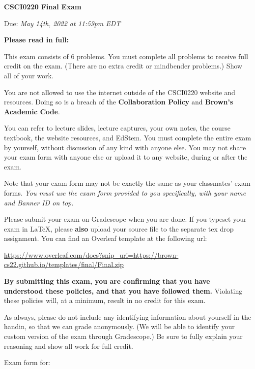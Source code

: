   \thispagestyle{firstpagestyle}
  \begin{center}
    {\huge \textbf{CSCI0220 Final Exam}}

    {\large Due: \textit{May 14th, 2022 at 11:59pm EDT}}
  \end{center}
  
 {\large \textbf{Please read in full:}}
 
This exam consists of 6 problems. You must complete all problems to receive full credit on the exam. 
(There are no extra credit or mindbender problems.) Show all of your work.
 
You are not allowed to use the internet outside of the CSCI0220 website and resources. Doing so is a breach of the \textbf{Collaboration Policy} and \textbf{Brown's Academic Code}.

You can refer to lecture slides, lecture captures, your own notes, the course textbook, the website resources, and EdStem. You must complete the entire exam by yourself, without discussion of any kind with anyone else.
You may not share your exam form with anyone else or upload it to any website, during or after the exam.

Note that your exam form may not be exactly the same as your classmates' exam forms. \emph{You must use the exam form provided to you specifically, with your name and Banner ID on top.}

Please submit your exam on Gradescope when you are done. If you typeset your exam in \LaTeX, please \textbf{also} upload your source file to the separate tex drop assignment.
You can find an Overleaf template at the following url:

{\scriptsize
\url{https://www.overleaf.com/docs?snip_uri=https://brown-cs22.github.io/templates/final/Final.zip}
}

\textbf{By submitting this exam, you are confirming that you have understood these policies, and that you have followed them.} Violating these policies will, at a minimum, result in no credit for this exam.

As always, please do not include any identifying information about yourself in the handin, so that we can grade anonymously. (We will be able to identify your custom version of the exam through Gradescope.) Be sure to fully explain your reasoning and show all work for full credit.

\bigskip 

Exam form for:

\studentname

